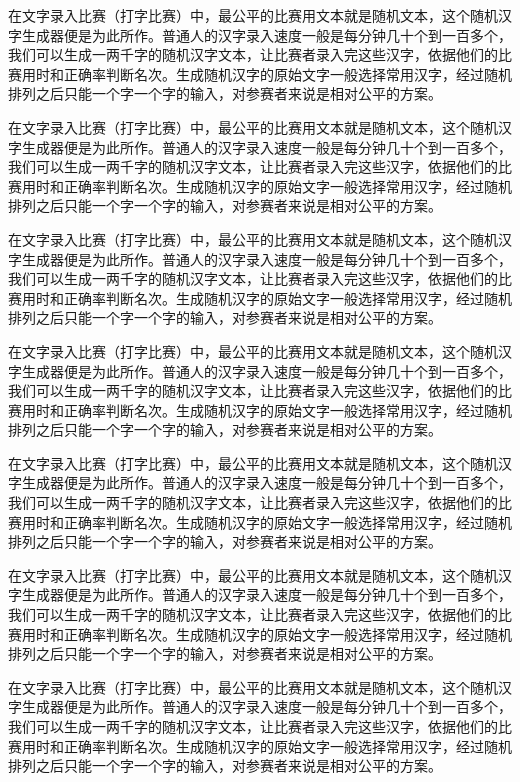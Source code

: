 \documentclass[12pt,hyperref,UTF8]{ctexbook}
\begin{document}
在文字录入比赛（打字比赛）中，最公平的比赛用文本就是随机文本，这个随机汉字生成器便是为此所作。普通人的汉字录入速度一般是每分钟几十个到一百多个，我们可以生成一两千字的随机汉字文本，让比赛者录入完这些汉字，依据他们的比赛用时和正确率判断名次。生成随机汉字的原始文字一般选择常用汉字，经过随机排列之后只能一个字一个字的输入，对参赛者来说是相对公平的方案。

在文字录入比赛（打字比赛）中，最公平的比赛用文本就是随机文本，这个随机汉字生成器便是为此所作。普通人的汉字录入速度一般是每分钟几十个到一百多个，我们可以生成一两千字的随机汉字文本，让比赛者录入完这些汉字，依据他们的比赛用时和正确率判断名次。生成随机汉字的原始文字一般选择常用汉字，经过随机排列之后只能一个字一个字的输入，对参赛者来说是相对公平的方案。

在文字录入比赛（打字比赛）中，最公平的比赛用文本就是随机文本，这个随机汉字生成器便是为此所作。普通人的汉字录入速度一般是每分钟几十个到一百多个，我们可以生成一两千字的随机汉字文本，让比赛者录入完这些汉字，依据他们的比赛用时和正确率判断名次。生成随机汉字的原始文字一般选择常用汉字，经过随机排列之后只能一个字一个字的输入，对参赛者来说是相对公平的方案。

在文字录入比赛（打字比赛）中，最公平的比赛用文本就是随机文本，这个随机汉字生成器便是为此所作。普通人的汉字录入速度一般是每分钟几十个到一百多个，我们可以生成一两千字的随机汉字文本，让比赛者录入完这些汉字，依据他们的比赛用时和正确率判断名次。生成随机汉字的原始文字一般选择常用汉字，经过随机排列之后只能一个字一个字的输入，对参赛者来说是相对公平的方案。

在文字录入比赛（打字比赛）中，最公平的比赛用文本就是随机文本，这个随机汉字生成器便是为此所作。普通人的汉字录入速度一般是每分钟几十个到一百多个，我们可以生成一两千字的随机汉字文本，让比赛者录入完这些汉字，依据他们的比赛用时和正确率判断名次。生成随机汉字的原始文字一般选择常用汉字，经过随机排列之后只能一个字一个字的输入，对参赛者来说是相对公平的方案。

在文字录入比赛（打字比赛）中，最公平的比赛用文本就是随机文本，这个随机汉字生成器便是为此所作。普通人的汉字录入速度一般是每分钟几十个到一百多个，我们可以生成一两千字的随机汉字文本，让比赛者录入完这些汉字，依据他们的比赛用时和正确率判断名次。生成随机汉字的原始文字一般选择常用汉字，经过随机排列之后只能一个字一个字的输入，对参赛者来说是相对公平的方案。

在文字录入比赛（打字比赛）中，最公平的比赛用文本就是随机文本，这个随机汉字生成器便是为此所作。普通人的汉字录入速度一般是每分钟几十个到一百多个，我们可以生成一两千字的随机汉字文本，让比赛者录入完这些汉字，依据他们的比赛用时和正确率判断名次。生成随机汉字的原始文字一般选择常用汉字，经过随机排列之后只能一个字一个字的输入，对参赛者来说是相对公平的方案。
\end{document}
